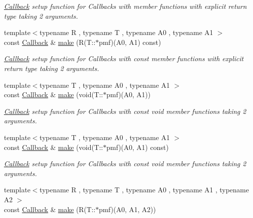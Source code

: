 \begin{DoxyCompactItemize}
\begin{DoxyCompactList}\small\item\em \hyperlink{class_d_d4hep_1_1_callback}{Callback} setup function for Callbacks with member functions with explicit return type taking 2 arguments. \end{DoxyCompactList}\item 
{\footnotesize template$<$typename R , typename T , typename A0 , typename A1 $>$ }\\const \hyperlink{class_d_d4hep_1_1_callback}{Callback} \& \hyperlink{class_d_d4hep_1_1_callback_a1fed0a6d4b9a456a76999c4e37648dc9}{make} (R(T\+::$\ast$pmf)(A0, A1) const)
\begin{DoxyCompactList}\small\item\em \hyperlink{class_d_d4hep_1_1_callback}{Callback} setup function for Callbacks with const member functions with explicit return type taking 2 arguments. \end{DoxyCompactList}\item 
{\footnotesize template$<$typename T , typename A0 , typename A1 $>$ }\\const \hyperlink{class_d_d4hep_1_1_callback}{Callback} \& \hyperlink{class_d_d4hep_1_1_callback_ae5896541592022892d7471fc19f9fc41}{make} (void(T\+::$\ast$pmf)(A0, A1))
\begin{DoxyCompactList}\small\item\em \hyperlink{class_d_d4hep_1_1_callback}{Callback} setup function for Callbacks with const void member functions taking 2 arguments. \end{DoxyCompactList}\item 
{\footnotesize template$<$typename T , typename A0 , typename A1 $>$ }\\const \hyperlink{class_d_d4hep_1_1_callback}{Callback} \& \hyperlink{class_d_d4hep_1_1_callback_afb5367dfd491fa58cd56d9e96b51a0e3}{make} (void(T\+::$\ast$pmf)(A0, A1) const)
\begin{DoxyCompactList}\small\item\em \hyperlink{class_d_d4hep_1_1_callback}{Callback} setup function for Callbacks with const void member functions taking 2 arguments. \end{DoxyCompactList}\item 
{\footnotesize template$<$typename R , typename T , typename A0 , typename A1 , typename A2 $>$ }\\const \hyperlink{class_d_d4hep_1_1_callback}{Callback} \& \hyperlink{class_d_d4hep_1_1_callback_aa3478e8f6f51ee606ad83ee0f7a7421d}{make} (R(T\+::$\ast$pmf)(A0, A1, A2))

\end{DoxyCompactItemize}
